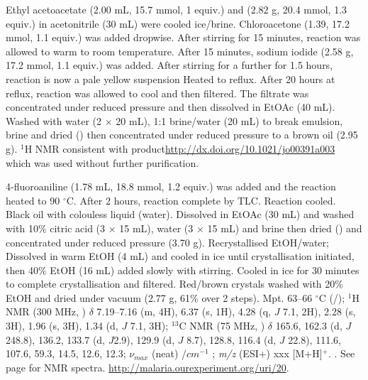\documentclass[12pt, a4paper,titlepage]{article}
\begin{document}
Ethyl acetoacetate (2.00 mL, 15.7 mmol, 1 equiv.) and  (2.82 g, 20.4 mmol, 1.3 equiv.) in acetonitrile (30 mL) were cooled ice/brine. Chloroacetone (1.39, 17.2 mmol, 1.1 equiv.) was added dropwise. After stirring for 15 minutes, reaction was allowed to warm to room temperature. After 15 minutes, sodium iodide (2.58 g, 17.2 mmol, 1.1 equiv.) was added. After stirring for a further for 1.5 hours, reaction is now a pale yellow suspension  Heated to reflux. After 20 hours at reflux, reaction was allowed to cool and then filtered. The filtrate was concentrated under reduced pressure and then dissolved in EtOAc (40 mL). Washed with water (2 $\times$ 20 mL), 1:1 brine/water (20 mL) to break emulsion, brine and dried () then concentrated under reduced pressure to a brown oil (2.95 g). $^1$H NMR consistent with product\url{http://dx.doi.org/10.1021/jo00391a003} which was used without further purification. 

4-fluoroaniline (1.78 mL, 18.8 mmol, 1.2 equiv.) was added and the reaction heated to 90 $^\circ$C. After 2 hours, reaction complete by TLC. Reaction cooled. Black oil with colouless liquid (water). Dissolved in EtOAc (30 mL) and washed with 10\% citric acid (3 $\times$ 15 mL), water (3 $\times$ 15 mL) and brine then dried () and concentrated under reduced pressure (3.70 g). Recrystallised EtOH/water; Dissolved in warm EtOH (4 mL) and cooled in ice until crystallisation initiated, then 40\% EtOH (16 mL) added slowly with stirring. Cooled in ice for 30 minutes to complete crystallisation and filtered. Red/brown crystals washed with 20\% EtOH and dried under vacuum (2.77 g, 61\% over 2 steps). 
Mpt. 63--66 $^\circ$C (/); 
$^1$H NMR (300 MHz, ) $\delta$ 7.19--7.16 (m, 4H), 6.37 (s, 1H), 4.28 (q, $J$ 7.1, 2H), 2.28 (s, 3H), 1.96 (s, 3H), 1.34 (d, $J$ 7.1, 3H); 
  $^{13}$C NMR (75 MHz, ) $\delta$ 165.6, 162.3 (d, $J$ 248.8), 136.2, 133.7 (d, $J$2.9), 129.9 (d, $J$ 8.7), 128.8, 116.4 (d, $J$ 22.8), 111.6, 107.6, 59.3, 14.5, 12.6, 12.3; 
 $\nu_{max}$ (neat) /$cm^{-1}$ ; 
\emph{m/z} (ESI+) xxx [M+H]$^+$.
.
 See page \pageref{spec:PMY6} for NMR spectra. \url{ http://malaria.ourexperiment.org/uri/20}. 
\end{document}

